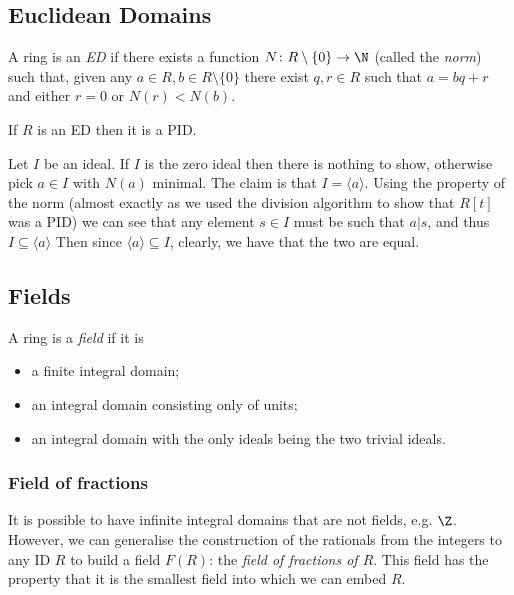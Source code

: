 \documentclass{maths}
\begin{document}
\subsection{Euclidean Domains}

\begin{defn}
    A ring is an \emph{ED} if there exists a function $N\colon R\setminus\{0\}\to\N$ (called the \emph{norm}) such that, given any $a\in R,b\in R\setminus\{0\}$ there exist $q,r\in R$ such that $a=bq+r$ and either $r=0$ or $N(r)<N(b)$.
\end{defn}

\begin{lem}
    If $R$ is an ED then it is a PID.
\end{lem}

\begin{prf}
    Let $I$ be an ideal.
    If $I$ is the zero ideal then there is nothing to show, otherwise pick $a\in I$ with $N(a)$ minimal.
    The claim is that $I=\langle a\rangle$.
    Using the property of the norm (almost exactly as we used the division algorithm to show that $R[t]$ was a PID) we can see that any element $s\in I$ must be such that $a|s$, and thus $I\subseteq\langle a\rangle$
    Then since $\langle a\rangle\subseteq I$, clearly, we have that the two are equal.
\end{prf}

\subsection{Fields}

\begin{defn}[Fields]
    A ring is a \emph{field} if it is
    \begin{itemize}
        \item a finite integral domain;
        \item an integral domain consisting only of units;
        \item an integral domain with the only ideals being the two trivial ideals.
    \end{itemize}
\end{defn}

\subsubsection{Field of fractions}

It is possible to have infinite integral domains that are not fields, e.g. $\Z$.
However, we can generalise the construction of the rationals from the integers to any ID $R$ to build a field $F(R)$: the \emph{field of fractions of $R$}.
This field has the property that it is the smallest field into which we can embed $R$.
\end{document}
